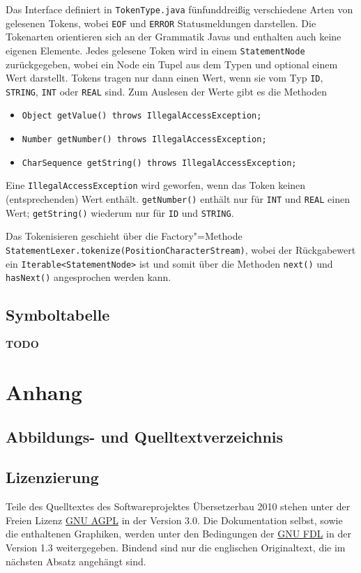 \documentclass[10pt,a4paper,ngerman,titlepage,tocindentauto]{scrartcl}
\newcommand{\TODO}{ {\LARGE\bf\color{crimson} TODO} }
\begin{document}
			Das Interface definiert in \texttt{TokenType.java} fünfunddreißig verschiedene Arten von gelesenen Tokens,
			wobei \texttt{EOF} und \texttt{ERROR} Statusmeldungen darstellen. Die Tokenarten orientieren sich
			an der Grammatik Javas und enthalten auch keine eigenen Elemente. Jedes gelesene Token wird in einem
			\texttt{StatementNode} zurückgegeben, wobei ein Node ein Tupel aus dem Typen und optional einem Wert
			darstellt.
			Tokens tragen nur dann einen Wert, wenn sie vom Typ \texttt{ID}, \texttt{STRING}, \texttt{INT} oder
			\texttt{REAL} sind. Zum Auslesen der Werte gibt es die Methoden
			\begin{itemize}
				\item \texttt{Object getValue() throws IllegalAccessException;}
				\item \texttt{Number getNumber() throws IllegalAccessException;}
				\item \texttt{CharSequence getString() throws IllegalAccessException;}
			\end{itemize}
			Eine \texttt{IllegalAccessException} wird geworfen, wenn das Token keinen (entsprechenden)
			Wert enthält. \texttt{getNumber()} enthält nur für \texttt{INT} und \texttt{REAL} einen Wert;
			\texttt{getString()} wiederum nur für \texttt{ID} und \texttt{STRING}.
			
			Das Tokenisieren geschieht über die Factory"=Methode \texttt{StatementLexer.tokenize(PositionCharacterStream)},
			wobei der Rückgabewert ein \texttt{Iterable<StatementNode>} ist und somit über die Methoden \texttt{next()} und
			\texttt{hasNext()} angesprochen werden kann.
	
		\subsection{Symboltabelle}
			\TODO
	
	\section{Anhang}
		\subsection{Abbildungs- und Quelltextverzeichnis}
			\listoffigures
			\lstlistoflistings
		
		\subsection{Lizenzierung}
			Teile des Quelltextes des Softwareprojektes Übersetzerbau 2010 stehen unter der Freien
			Lizenz \href{http://www.gnu.org/licenses/agpl-3.0.html}{GNU AGPL} in der Version 3.0.
			Die Dokumentation selbst, sowie die enthaltenen Graphiken, werden unter den Bedingungen
			der \href{http://www.gnu.org/licenses/fdl-1.3.html}{GNU FDL} in der Version 1.3 weitergegeben.
			Bindend sind nur die englischen Originaltext, die im nächsten Absatz angehängt sind.
			
\end{document}
